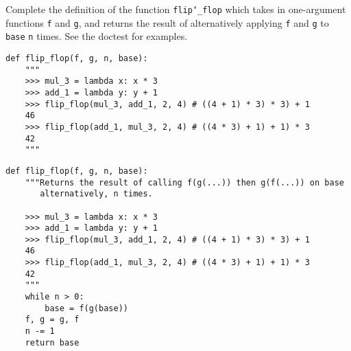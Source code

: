 \begin{blocksection}
\question Complete the definition of the function \texttt{flip\char`_flop} which takes in one-argument functions \texttt{f} and \texttt{g}, and returns the result of alternatively applying \texttt{f} and \texttt{g} to \texttt{base} \texttt{n} times. See the doctest for examples. \\

\begin{lstlisting}
def flip_flop(f, g, n, base):
    """
    >>> mul_3 = lambda x: x * 3
    >>> add_1 = lambda y: y + 1
    >>> flip_flop(mul_3, add_1, 2, 4) # ((4 + 1) * 3) * 3) + 1
    46
    >>> flip_flop(add_1, mul_3, 2, 4) # ((4 * 3) + 1) + 1) * 3
    42
    """
\end{lstlisting}

\begin{solution}
\begin{lstlisting}
def flip_flop(f, g, n, base):
    """Returns the result of calling f(g(...)) then g(f(...)) on base 
       alternatively, n times.
    
    >>> mul_3 = lambda x: x * 3
    >>> add_1 = lambda y: y + 1
    >>> flip_flop(mul_3, add_1, 2, 4) # ((4 + 1) * 3) * 3) + 1
    46
    >>> flip_flop(add_1, mul_3, 2, 4) # ((4 * 3) + 1) + 1) * 3
    42
    """
    while n > 0:	
        base = f(g(base))	
	f, g = g, f
	n -= 1	
    return base

\end{lstlisting}
\end{solution}
\end{blocksection}
